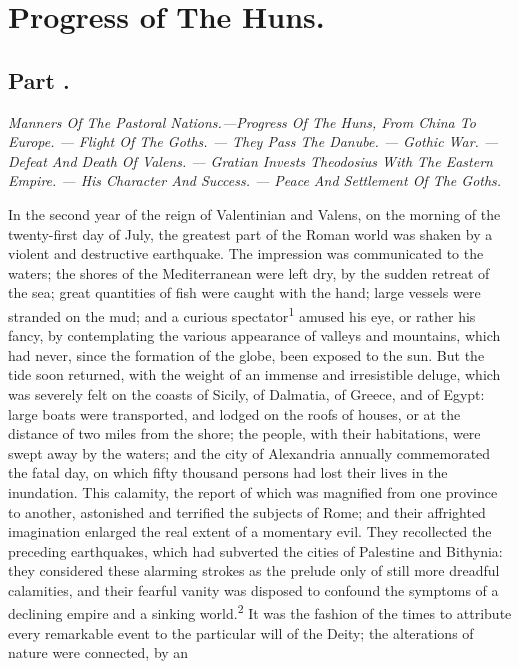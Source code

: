 \chapter{Progress of The Huns.}
\section{Part \thesection.}

\textit{Manners Of The Pastoral Nations.—Progress Of The Huns, From China
To Europe. — Flight Of The Goths. — They Pass The Danube. — Gothic
War. — Defeat And Death Of Valens. — Gratian Invests Theodosius With
The Eastern Empire. — His Character And Success. — Peace And
Settlement Of The Goths.}
\vspace{\onelineskip}

In the second year of the reign of Valentinian and Valens, on the
morning of the twenty-first day of July, the greatest part of the
Roman world was shaken by a violent and destructive earthquake.
The impression was communicated to the waters; the shores of the
Mediterranean were left dry, by the sudden retreat of the sea;
great quantities of fish were caught with the hand; large vessels
were stranded on the mud; and a curious spectator\textsuperscript{1} amused his
eye, or rather his fancy, by contemplating the various appearance
of valleys and mountains, which had never, since the formation of
the globe, been exposed to the sun. But the tide soon returned,
with the weight of an immense and irresistible deluge, which was
severely felt on the coasts of Sicily, of Dalmatia, of Greece,
and of Egypt: large boats were transported, and lodged on the
roofs of houses, or at the distance of two miles from the shore;
the people, with their habitations, were swept away by the
waters; and the city of Alexandria annually commemorated the
fatal day, on which fifty thousand persons had lost their lives
in the inundation. This calamity, the report of which was
magnified from one province to another, astonished and terrified
the subjects of Rome; and their affrighted imagination enlarged
the real extent of a momentary evil. They recollected the
preceding earthquakes, which had subverted the cities of
Palestine and Bithynia: they considered these alarming strokes as
the prelude only of still more dreadful calamities, and their
fearful vanity was disposed to confound the symptoms of a
declining empire and a sinking world.\textsuperscript{2} It was the fashion of the
times to attribute every remarkable event to the particular will
of the Deity; the alterations of nature were connected, by an
